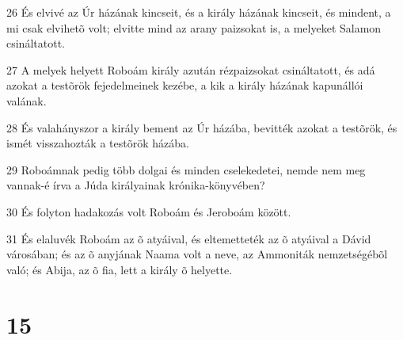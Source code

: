 \par 26 És elvivé az Úr házának kincseit, és a király házának kincseit, és mindent, a mi csak elvihetõ volt; elvitte mind az arany paizsokat is, a melyeket Salamon csináltatott.
\par 27 A melyek helyett Roboám király azután rézpaizsokat csináltatott, és adá azokat a testõrök fejedelmeinek kezébe, a kik a király házának kapunállói valának.
\par 28 És valahányszor a király bement az Úr házába, bevitték azokat a testõrök, és ismét visszahozták a testõrök házába.
\par 29 Roboámnak pedig több dolgai és minden cselekedetei, nemde nem meg vannak-é írva a Júda királyainak krónika-könyvében?
\par 30 És folyton hadakozás volt Roboám és Jeroboám között.
\par 31 És elaluvék Roboám az õ atyáival, és eltemetteték az õ atyáival a Dávid városában; és az õ anyjának Naama volt a neve, az Ammoniták nemzetségébõl való; és Abija, az õ fia, lett a király õ helyette.

\chapter{15}


